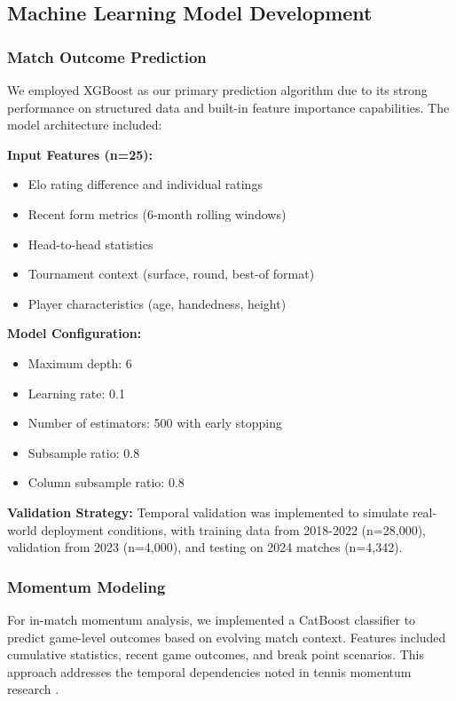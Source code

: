 \documentclass[11pt,a4paper]{article}
\begin{document}
\subsection{Machine Learning Model Development}

\subsubsection{Match Outcome Prediction}

We employed XGBoost \citep{chen2016xgboost} as our primary prediction algorithm due to its strong performance on structured data and built-in feature importance capabilities. The model architecture included:

\textbf{Input Features (n=25):}
\begin{itemize}
    \item Elo rating difference and individual ratings
    \item Recent form metrics (6-month rolling windows)
    \item Head-to-head statistics
    \item Tournament context (surface, round, best-of format)
    \item Player characteristics (age, handedness, height)
\end{itemize}

\textbf{Model Configuration:}
\begin{itemize}
    \item Maximum depth: 6
    \item Learning rate: 0.1
    \item Number of estimators: 500 with early stopping
    \item Subsample ratio: 0.8
    \item Column subsample ratio: 0.8
\end{itemize}

\textbf{Validation Strategy:}
Temporal validation was implemented to simulate real-world deployment conditions, with training data from 2018-2022 (n=28,000), validation from 2023 (n=4,000), and testing on 2024 matches (n=4,342).

\subsubsection{Momentum Modeling}

For in-match momentum analysis, we implemented a CatBoost classifier \citep{prokhorenkova2018catboost} to predict game-level outcomes based on evolving match context. Features included cumulative statistics, recent game outcomes, and break point scenarios. This approach addresses the temporal dependencies noted in tennis momentum research \citep{wei2013predicting}.
\end{document}
